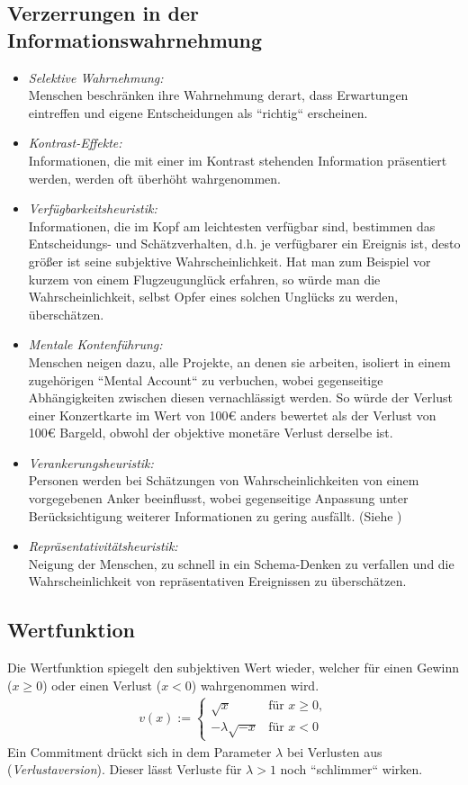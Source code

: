 \documentclass{panikzettel}
\begin{document}
\subsection{Verzerrungen in der Informationswahrnehmung \cite{vonNitzsch:211553}}
\begin{itemize}
	\item \textit{Selektive Wahrnehmung:}\\
	Menschen beschränken ihre Wahrnehmung derart, dass Erwartungen eintreffen und eigene Entscheidungen als ``richtig`` erscheinen.
	\item \textit{Kontrast-Effekte:}\\
	Informationen, die mit einer im Kontrast stehenden Information präsentiert werden, werden oft überhöht wahrgenommen.
	\item \textit{Verfügbarkeitsheuristik:}\\
	Informationen, die im Kopf am leichtesten verfügbar sind, bestimmen das Entscheidungs- und Schätzverhalten, d.h. je verfügbarer ein Ereignis ist, desto größer ist seine subjektive Wahrscheinlichkeit. Hat man zum Beispiel vor kurzem von einem Flugzeugunglück erfahren, so würde man die Wahrscheinlichkeit, selbst Opfer eines solchen Unglücks zu werden, überschätzen.
	\item \textit{Mentale Kontenführung:}\\
	Menschen neigen dazu, alle Projekte, an denen sie arbeiten, isoliert in einem zugehörigen ``Mental Account`` zu verbuchen, wobei gegenseitige Abhängigkeiten zwischen diesen vernachlässigt werden. So würde der Verlust einer Konzertkarte im Wert von 100\euro{} anders bewertet als der Verlust von 100\euro{} Bargeld, obwohl der objektive monetäre Verlust derselbe ist.
	\item \textit{Verankerungsheuristik:}\\
	Personen werden bei Schätzungen von Wahrscheinlichkeiten von einem vorgegebenen Anker beeinflusst, wobei gegenseitige Anpassung unter Berücksichtigung weiterer Informationen zu gering ausfällt. (Siehe )
	\item \textit{Repräsentativitätsheuristik:}\\
	Neigung der Menschen, zu schnell in ein Schema-Denken zu verfallen und die Wahrscheinlichkeit von repräsentativen Ereignissen zu überschätzen.
\end{itemize}

\subsection{Wertfunktion}
Die Wertfunktion spiegelt den subjektiven Wert wieder, welcher für einen Gewinn ($ x \geq 0 $) oder einen Verlust ($ x < 0 $) wahrgenommen wird.
\begin{align*}
	v(x) := \begin{cases}
	\sqrt{x} & \text{für } x\geq 0,\\
	-\lambda\sqrt{-x} & \text{für } x < 0
	\end{cases}
\end{align*}
Ein Commitment drückt sich in dem Parameter $ \lambda $ bei Verlusten aus (\textit{Verlustaversion}). Dieser lässt Verluste für $ \lambda > 1 $ noch ``schlimmer`` wirken.
\end{document}
